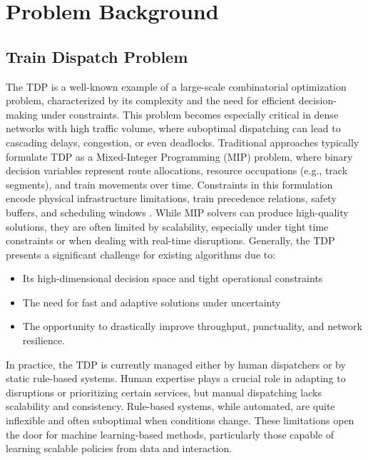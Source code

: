 \documentclass[runningheads]{llncs}
\begin{document}
\section{Problem Background}
\label{sse:background}
\subsection{Train Dispatch Problem}
\label{sss:train}
The TDP is a well-known example of a large-scale combinatorial optimization problem, characterized by its complexity and the need for efficient decision-making under constraints. 
This problem becomes especially critical in dense networks with high traffic volume, where suboptimal dispatching can lead to cascading delays, congestion, or even deadlocks.
Traditional approaches typically formulate TDP as a Mixed-Integer Programming (MIP) problem, where binary decision variables represent route allocations, resource occupations (e.g., track segments), and train movements over time. 
Constraints in this formulation encode physical infrastructure limitations, train precedence relations, safety buffers, and scheduling windows \cite{train:LAMORGESE2013559}. 
While MIP solvers can produce high-quality solutions, they are often limited by scalability, especially under tight time constraints or when dealing with real-time disruptions.
Generally, the TDP presents a significant challenge for existing algorithms due to: \begin{itemize} \item Its high-dimensional decision space and tight operational constraints \item The need for fast and adaptive solutions under uncertainty \item The opportunity to drastically improve throughput, punctuality, and network resilience. \end{itemize}

In practice, the TDP is currently managed either by human dispatchers or by static rule-based systems. 
Human expertise plays a crucial role in adapting to disruptions or prioritizing certain services, but manual dispatching lacks scalability and consistency. 
Rule-based systems, while automated, are quite inflexible and often suboptimal when conditions change. 
These limitations open the door for machine learning-based methods, particularly those capable of learning scalable policies from data and interaction.
\end{document}
